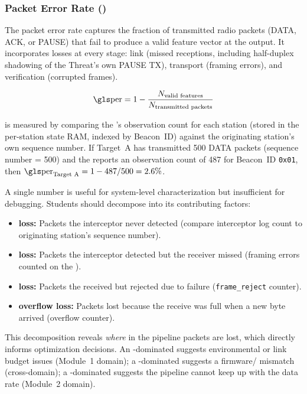 \documentclass[11pt,letterpaper]{article}
\begin{document}
	\subsubsection{Packet Error Rate (\PER{})}

	The packet error rate captures the fraction of transmitted radio packets (DATA, ACK, or PAUSE) that fail to produce a valid feature vector at the \FPGA{} output. It incorporates losses at every stage: \RF{} link (missed receptions, including half-duplex shadowing of the Threat's own PAUSE TX), \UART{} transport (framing errors), and \CRC{} verification (corrupted frames).

	\begin{equation}
		\text{\PER{}} = 1 - \frac{N_{\text{valid features}}}{N_{\text{transmitted packets}}}
		\label{eq:per}
	\end{equation}

	\PER{} is measured by comparing the \FPGA{}'s observation count for each station (stored in the per-station state RAM, indexed by Beacon~ID) against the originating station's own sequence number. If Target~A has transmitted 500 DATA packets (sequence number = 500) and the \FPGA{} reports an observation count of 487 for Beacon~ID \texttt{0x01}, then $\text{\PER{}}_{\text{Target A}} = 1 - 487/500 = 2.6\%$.

	\begin{tcolorbox}[infobox={Decomposing \PER{}}]
		A single \PER{} number is useful for system-level characterization but insufficient for debugging. Students should decompose \PER{} into its contributing factors:
		\begin{itemize}
			\item \textbf{\RF{} loss:} Packets the interceptor never detected (compare interceptor log count to originating station's sequence number).
			\item \textbf{\UART{} loss:} Packets the interceptor detected but the \FPGA{} \UART{} receiver missed (framing errors counted on the \FPGA{}).
			\item \textbf{\CRC{} loss:} Packets the \FPGA{} received but rejected due to \CRC{} failure (\texttt{frame\_reject} counter).
			\item \textbf{\FIFO{} overflow loss:} Packets lost because the receive \FIFO{} was full when a new byte arrived (overflow counter).
		\end{itemize}
		This decomposition reveals \emph{where} in the pipeline packets are lost, which directly informs optimization decisions. An \RF{}-dominated \PER{} suggests environmental or link budget issues (Module~1 domain); a \CRC{}-dominated \PER{} suggests a firmware/\RTL{} mismatch (cross-domain); a \FIFO{}-dominated \PER{} suggests the \FPGA{} pipeline cannot keep up with the data rate (Module~2 domain).
	\end{tcolorbox}
\end{document}
